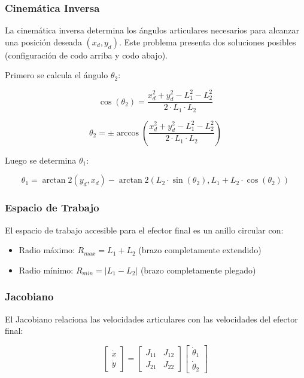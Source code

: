 \subsubsection{Cinemática Inversa}

La cinemática inversa determina los ángulos articulares necesarios para alcanzar una posición deseada $(x_d, y_d)$. Este problema presenta dos soluciones posibles (configuración de codo arriba y codo abajo).

Primero se calcula el ángulo $\theta_2$:

\begin{equation}
    \cos(\theta_2) = \frac{x_d^2 + y_d^2 - L_1^2 - L_2^2}{2 \cdot L_1 \cdot L_2}
\end{equation}

\begin{equation}
    \theta_2 = \pm \arccos\left(\frac{x_d^2 + y_d^2 - L_1^2 - L_2^2}{2 \cdot L_1 \cdot L_2}\right)
\end{equation}

Luego se determina $\theta_1$:

\begin{equation}
    \theta_1 = \arctan2(y_d, x_d) - \arctan2(L_2 \cdot \sin(\theta_2), L_1 + L_2 \cdot \cos(\theta_2))
\end{equation}

\subsubsection{Espacio de Trabajo}

El espacio de trabajo accesible para el efector final es un anillo circular con:

\begin{itemize}
    \item Radio máximo: $R_{max} = L_1 + L_2$ (brazo completamente extendido)
    \item Radio mínimo: $R_{min} = |L_1 - L_2|$ (brazo completamente plegado)
\end{itemize}

\subsubsection{Jacobiano}

El Jacobiano relaciona las velocidades articulares con las velocidades del efector final:

\begin{equation}
    \begin{bmatrix}
        \dot{x} \\
        \dot{y}
    \end{bmatrix}
    =
    \begin{bmatrix}
        J_{11} & J_{12} \\
        J_{21} & J_{22}
    \end{bmatrix}
    \begin{bmatrix}
        \dot{\theta}_1 \\
        \dot{\theta}_2
    \end{bmatrix}
\end{equation}

